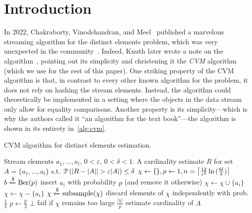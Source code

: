 \section{Introduction}
\label{sec:intro}

In 2022, Chakraborty, Vinodchandran, and Meel~\cite{chakraborty2022} published a marvelous streaming algorithm for the distinct elements problem, which was very unexpected in the community~\cite{quanta}.
Indeed, Knuth later wrote a note on the algorithm~\cite{knuthnote}, pointing out its simplicity and christening it the \emph{CVM} algorithm (which we use for the rest of this paper).
One striking property of the CVM algorithm is that, in contrast to every other known algorithm for the problem, it does not rely on hashing the stream elements.
Instead, the algorithm could theoretically be implemented in a setting where the objects in the data stream only allow for equality comparisons.
Another property is its simplicity---which is why the authors called it ``an algorithm for the text book''---the algorithm is shown in its entirety in~\cref{alg:cvm}.

\begin{algorithm}[h!]
	\caption{CVM algorithm for distinct elements estimation.}\label{alg:cvm}
	\begin{algorithmic}[1]
  \Require Stream elements $a_1,\dots,a_l$, $0 < \varepsilon$, $0 < \delta < 1$.
  \Ensure A cardinality estimate $R$ for set $A = \{ a_1,\dots,a_l \}$ s.t. $\prob \left( |R - |A| | > \varepsilon |A| \right) \leq \delta$
  \State $\chi \gets \{\}, p \gets 1, n = \ceil*{\frac{12}{\varepsilon^2} \ln{(\frac{6l}{\delta})} }$
    \State $b \getsr \Ber(p)$ \Comment insert $a_i$ with probability $p$ (and remove it otherwise)
      \State $\chi \gets \chi \cup \{a_i\}$
    \Else
      \State $\chi \gets \chi - \{a_i\}$
    \EndIf
      \State $\chi \getsr \mathrm{subsample}(\chi)$ \Comment discard elements of $\chi$ independently with prob. $\frac{1}{2}$
      \State $p \gets \frac{p}{2}$
    \EndIf
      \Return $\bot$ \Comment fail if $\chi$ remains too large
    \EndIf
  \EndFor
  \State \Return $\frac{|\chi|}{p}$ \Comment estimate cardinality of $A$
  \end{algorithmic}
\end{algorithm}

